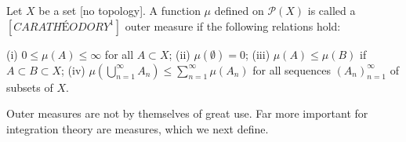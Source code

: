 Let $X$ be a set [no topology]. A function $\mu$ defined on $\mathcal{P}(X)$ is called a $[CARATHÉODORY^1]$ outer measure if the following relations hold:

(i) $0 \leq \mu(A) \leq \infty$ for all $A \subset X$;
(ii) $\mu(\emptyset) = 0$;
(iii) $\mu(A) \leq \mu(B)$ if $A \subset B \subset X$;
(iv) $\mu\left(\bigcup_{n=1}^{\infty} A_n\right) \leq \sum_{n=1}^{\infty} \mu(A_n)$ for all sequences $(A_n)_{n=1}^{\infty}$ of subsets of $X$.

Outer measures are not by themselves of great use. Far more important for integration theory are measures, which we next define.